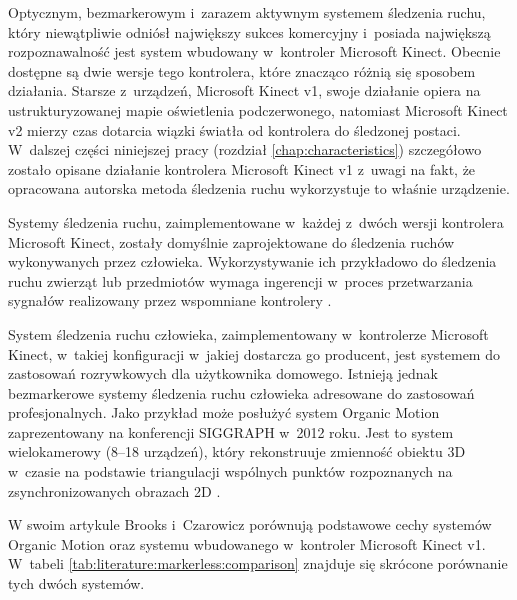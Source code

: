 Optycznym, bezmarkerowym i~zarazem aktywnym systemem śledzenia ruchu, który niewątpliwie odniósł największy sukces komercyjny i~posiada największą rozpoznawalność jest system wbudowany w~kontroler Microsoft Kinect. Obecnie dostępne są dwie wersje tego kontrolera, które znacząco różnią się sposobem działania. Starsze z~urządzeń, Microsoft Kinect v1, swoje działanie opiera na ustrukturyzowanej mapie oświetlenia podczerwonego, natomiast Microsoft Kinect v2 mierzy czas dotarcia wiązki światła od kontrolera do śledzonej postaci. W~dalszej części niniejszej pracy (rozdział \ref{chap:characteristics}) szczegółowo zostało opisane działanie kontrolera Microsoft Kinect v1 z~uwagi na fakt, że opracowana autorska metoda śledzenia ruchu wykorzystuje to właśnie urządzenie. 
			
Systemy śledzenia ruchu, zaimplementowane w~każdej z~dwóch wersji kontrolera Microsoft Kinect, zostały domyślnie zaprojektowane do śledzenia ruchów wykonywanych przez człowieka. Wykorzystywanie ich przykładowo do śledzenia ruchu zwierząt lub przedmiotów wymaga ingerencji w~proces przetwarzania sygnałów realizowany przez wspomniane kontrolery \cite{Nirjon2012}.
			
System śledzenia ruchu człowieka, zaimplementowany w~kontrolerze Microsoft Kinect, w~takiej konfiguracji w~jakiej dostarcza go producent, jest systemem do zastosowań rozrywkowych dla użytkownika domowego. Istnieją jednak bezmarkerowe systemy śledzenia ruchu człowieka adresowane do zastosowań profesjonalnych. Jako przykład może posłużyć system Organic Motion zaprezentowany na konferencji SIGGRAPH w~2012 roku. Jest to system wielokamerowy (8--18 urządzeń), który rekonstruuje zmienność obiektu 3D w~czasie na podstawie triangulacji wspólnych punktów rozpoznanych na zsynchronizowanych obrazach 2D \cite{Brooks2012}.
			
W swoim artykule Brooks i~Czarowicz \cite{Brooks2012} porównują podstawowe cechy systemów Organic Motion oraz systemu wbudowanego w~kontroler Microsoft Kinect v1. W~tabeli \ref{tab:literature:markerless:comparison} znajduje się skrócone porównanie tych dwóch systemów. 
			

